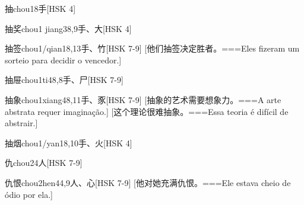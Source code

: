 \begin{EntryWithPhonetic}{抽}{chou1}{8}{⼿}[HSK 4]
\end{EntryWithPhonetic}

\begin{EntryWithPhonetic}{抽奖}{chou1 jiang3}{8,9}{⼿、⼤}[HSK 4]
\end{EntryWithPhonetic}

\begin{EntryWithPhonetic}{抽签}{chou1/qian1}{8,13}{⼿、⽵}[HSK 7-9]
  [他们抽签决定胜者。===Eles fizeram um sorteio para decidir o vencedor.]
\end{EntryWithPhonetic}

\begin{EntryWithPhonetic}{抽屉}{chou1ti4}{8,8}{⼿、⼫}[HSK 7-9]
\end{EntryWithPhonetic}

\begin{EntryWithPhonetic}{抽象}{chou1xiang4}{8,11}{⼿、⾗}[HSK 7-9]
  [抽象的艺术需要想象力。===A arte abstrata requer imaginação.]
  [这个理论很难抽象。===Essa teoria é difícil de abstrair.]
\end{EntryWithPhonetic}

\begin{EntryWithPhonetic}{抽烟}{chou1/yan1}{8,10}{⼿、⽕}[HSK 4]
\end{EntryWithPhonetic}

\begin{EntryWithPhonetic}{仇}{chou2}{4}{⼈}[HSK 7-9]
\end{EntryWithPhonetic}

\begin{EntryWithPhonetic}{仇恨}{chou2hen4}{4,9}{⼈、⼼}[HSK 7-9]
  [他对她充满仇恨。===Ele estava cheio de ódio por ela.]
\end{EntryWithPhonetic}

